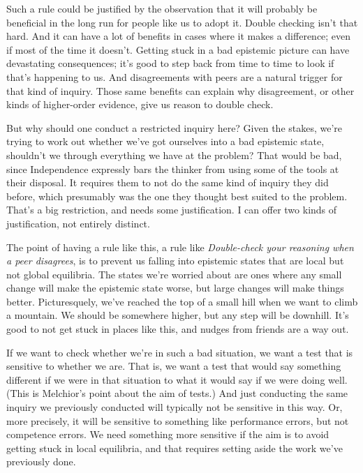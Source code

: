 \documentclass[
  12pt,
  letterpaper,
]{scrbook}
\begin{document}
Such a rule could be justified by the observation that it will probably
be beneficial in the long run for people like us to adopt it. Double
checking isn't that hard. And it can have a lot of benefits in cases
where it makes a difference; even if most of the time it doesn't.
Getting stuck in a bad epistemic picture can have devastating
consequences; it's good to step back from time to time to look if that's
happening to us. And disagreements with peers are a natural trigger for
that kind of inquiry. Those same benefits can explain why disagreement,
or other kinds of higher-order evidence, give us reason to double check.

But why should one conduct a restricted inquiry here? Given the stakes,
we're trying to work out whether we've got ourselves into a bad
epistemic state, shouldn't we through everything we have at the problem?
That would be bad, since Independence expressly bars the thinker from
using some of the tools at their disposal. It requires them to not do
the same kind of inquiry they did before, which presumably was the one
they thought best suited to the problem. That's a big restriction, and
needs some justification. I can offer two kinds of justification, not
entirely distinct.

The point of having a rule like this, a rule like \emph{Double-check
your reasoning when a peer disagrees}, is to prevent us falling into
epistemic states that are local but not global equilibria. The states
we're worried about are ones where any small change will make the
epistemic state worse, but large changes will make things better.
Picturesquely, we've reached the top of a small hill when we want to
climb a mountain. We should be somewhere higher, but any step will be
downhill. It's good to not get stuck in places like this, and nudges
from friends are a way out.

If we want to check whether we're in such a bad situation, we want a
test that is sensitive to whether we are. That is, we want a test that
would say something different if we were in that situation to what it
would say if we were doing well. (This is Melchior's point about the aim
of tests.) And just conducting the same inquiry we previously conducted
will typically not be sensitive in this way. Or, more precisely, it will
be sensitive to something like performance errors, but not competence
errors. We need something more sensitive if the aim is to avoid getting
stuck in local equilibria, and that requires setting aside the work
we've previously done.
\end{document}
